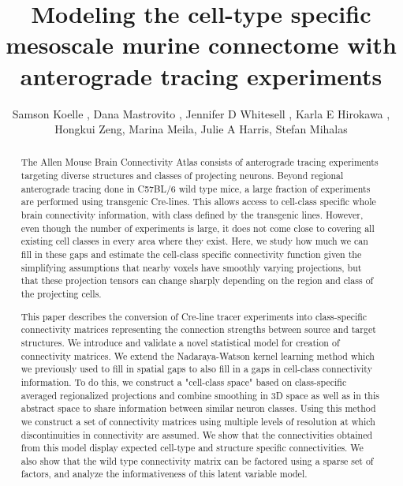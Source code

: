 \documentclass[NETN,manuscript]{stjour-new}
\begin{document}
\title{Modeling the cell-type specific mesoscale murine connectome with anterograde tracing experiments}

\author[Koelle et al]%
{Samson Koelle , Dana Mastrovito , Jennifer D Whitesell , Karla E Hirokawa ,  Hongkui Zeng, Marina Meila, Julie A Harris, Stefan Mihalas}





\begin{abstract}
The Allen Mouse Brain Connectivity Atlas consists of anterograde tracing experiments targeting diverse structures and classes of projecting neurons.
Beyond regional anterograde tracing done in C57BL/6 wild type mice, a large fraction of experiments are performed using transgenic Cre-lines.
This allows access to cell-class specific whole brain connectivity information, with class defined by the transgenic lines.
However, even though the number of experiments is large, it does not come close to covering all existing cell classes in every area where they exist.
Here, we study how much we can fill in these gaps and estimate the cell-class specific connectivity function given the simplifying assumptions that nearby voxels have smoothly varying projections, but that these projection tensors can change sharply depending on the region and class of the projecting cells.

This paper describes the conversion of Cre-line tracer experiments into class-specific connectivity matrices representing the connection strengths between source and target structures.
We introduce and validate a novel statistical model for creation of connectivity matrices.
We extend the Nadaraya-Watson kernel learning method which we previously used to fill in spatial gaps to also fill in a gaps in cell-class connectivity information.
To do this, we construct a "cell-class space" based on class-specific averaged regionalized projections and combine smoothing in 3D space as well as in this abstract space to share information between similar neuron classes.
Using this method we construct a set of connectivity matrices using multiple levels of resolution at which discontinuities in connectivity are assumed. We show that the connectivities obtained from this model display expected cell-type and structure specific connectivities. 
We also show that the wild type connectivity matrix can be factored using a sparse set of factors, and analyze the informativeness of this latent variable model.

\end{abstract}
\end{document}
